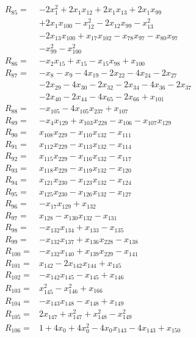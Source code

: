 \begin{align*}
R_{85}={}&-2x_{1}^{2} +2x_{1}x_{12} +2x_{1}x_{13} +2x_{1}x_{99}\\
&+2x_{1}x_{100} -x_{12}^{2} -2x_{12}x_{99} -x_{13}^{2}\\
&-2x_{13}x_{100} +x_{17}x_{102} -x_{78}x_{97} -x_{80}x_{97}\\
&-x_{99}^{2} -x_{100}^{2}\\[3pt]
R_{86}={}&-x_{2}x_{15} +x_{15} -x_{15}x_{98} +x_{100}\\[3pt]
R_{87}={}&-x_{8} -x_{9} -4x_{19} -2x_{22} -4x_{24} -2x_{27}\\
&-2x_{29} -4x_{30} -2x_{32} -2x_{34} -4x_{36} -2x_{37}\\
&-2x_{40} -2x_{44} -4x_{65} -2x_{66} +x_{101}\\[3pt]
R_{88}={}&-x_{105} -4x_{105}x_{237} +x_{107}\\[3pt]
R_{89}={}&-x_{4}x_{129} +x_{103}x_{228} -x_{106} -x_{107}x_{129}\\[3pt]
R_{90}={}&x_{108}x_{229} -x_{110}x_{132} -x_{111}\\[3pt]
R_{91}={}&x_{112}x_{229} -x_{113}x_{132} -x_{114}\\[3pt]
R_{92}={}&x_{115}x_{229} -x_{116}x_{132} -x_{117}\\[3pt]
R_{93}={}&x_{118}x_{229} -x_{119}x_{132} -x_{120}\\[3pt]
R_{94}={}&x_{121}x_{230} -x_{123}x_{132} -x_{124}\\[3pt]
R_{95}={}&x_{125}x_{230} -x_{126}x_{132} -x_{127}\\[3pt]
R_{96}={}&-x_{17}x_{129} +x_{132}\\[3pt]
R_{97}={}&x_{128} -x_{130}x_{132} -x_{131}\\[3pt]
R_{98}={}&-x_{132}x_{134} +x_{133} -x_{135}\\[3pt]
R_{99}={}&-x_{132}x_{137} +x_{136}x_{228} -x_{138}\\[3pt]
R_{100}={}&-x_{132}x_{140} +x_{139}x_{229} -x_{141}\\[3pt]
R_{101}={}&x_{142} -2x_{142}x_{144} +x_{145}\\[3pt]
R_{102}={}&-x_{142}x_{145} -x_{145} +x_{146}\\[3pt]
R_{103}={}&x_{145}^{2} -x_{146}^{2} +x_{166}\\[3pt]
R_{104}={}&-x_{143}x_{148} -x_{148} +x_{149}\\[3pt]
R_{105}={}&2x_{147} +x_{147}^{2} +x_{148}^{2} -x_{149}^{2}\\[3pt]
R_{106}={}&1 +4x_{0} +4x_{0}^{2} -4x_{0}x_{143} -4x_{143} +x_{150}\\[3pt]

\end{align*}

